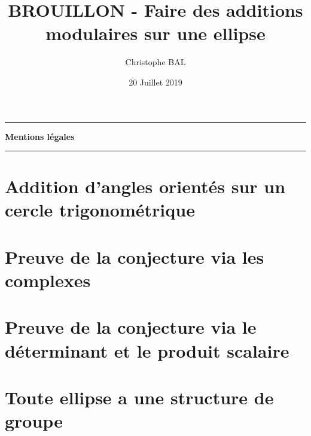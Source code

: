\documentclass[12pt]{amsart}
\begin{document}
\title{BROUILLON - Faire des additions modulaires sur une ellipse}
\author{Christophe BAL}
\date{20 Juillet 2019}
\maketitle


\begin{center}
	\hrule\vspace{.3em}
	{
		\fontsize{1.35em}{1em}\selectfont
		\textbf{Mentions \og légales \fg}
	}
			
	\vspace{0.45em}
	\doclicenseThis
	\hrule
\end{center}



\setcounter{tocdepth}{2}
\tableofcontents




\newpage
\section{Addition d'angles orientés sur un cercle trigonométrique}





\section{Preuve de la conjecture via les complexes}
\label{proof-via-C}
                        




\section{Preuve de la conjecture via le déterminant et le produit scalaire} 
\label{proof-rambo-style}





\section{Toute ellipse a une structure de groupe}
      

\end{document}

